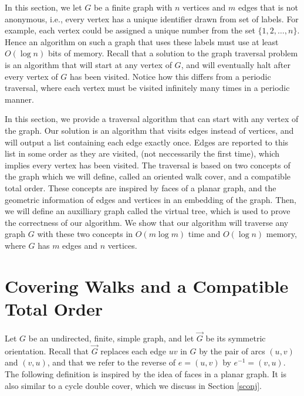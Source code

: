 \documentclass[12pt,letterpaper,oneside]{book}
\begin{document}
In this section, we let $G$ be a finite graph with $n$ vertices and $m$ edges 
that is not anonymous, i.e., every vertex has a unique identifier drawn from set 
of labels.  For example, each vertex could be assigned a unique number from the set $\{1,2,\ldots,n\}$.  Hence an algorithm on such a 
graph that uses these labels must use at least $O(\log n)$ bits of memory.  
Recall that a solution to the graph traversal problem is an algorithm that will start at any vertex of $G$, and will eventually halt after 
every vertex of $G$ has been visited.  Notice how this differs from a periodic traversal, where each vertex must be visited infinitely many 
times in a periodic manner.  


In this section, we provide a traversal algorithm that can start with any vertex of the graph.  
Our solution is an algorithm that visits edges instead of vertices, and will output a list containing each edge exactly once.  Edges 
are reported to this list in some order as they are visited, (not neccessarily the first time), 
which implies every vertex has been visited.  
The traversal is based on two concepts of the graph 
which we will define, called an oriented walk cover, and a compatible total order.  
These concepts are inspired 
by faces of a planar graph, and the geometric information of edges and vertices in an embedding of the graph.  Then, we will define 
an auxilliary graph called the virtual tree, which is used to prove the correctness of our algorithm.  We show that 
our algorithm will traverse any graph $G$ with these two concepts in $O(m\log m)$ time and $O(\log n)$ memory, where $G$ has $m$ edges 
and $n$ vertices.  



\newpage
\section{Covering Walks and a Compatible Total Order}
\label{ss-prelim}

Let $G$ be an undirected, finite, simple graph, and let $\vec{G}$ be its symmetric orientation.  Recall that $\vec{G}$ replaces each  
edge $uv$ in $G$ by the pair of arcs $(u,v)$ and $(v,u)$, and that we refer to the 
reverse of $e= (u,v)$ by $e^{-1} = (v,u)$.  The following definition is inspired by the idea of faces in a planar graph.  It is also 
similar to a cycle double cover, which we discuss in Section \ref{sconj}.  

\end{document}
